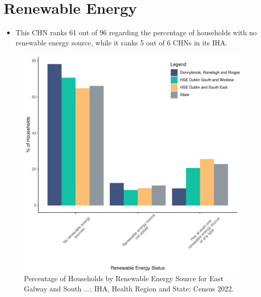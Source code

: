 \documentclass{article}
\begin{document}
\section{Renewable Energy}\label{sect:RE}
\begin{itemize}
\item This CHN ranks  61 out of 96 regarding the percentage of households with no renewable energy source, while it ranks   5 out of 6 CHNs in its IHA.
\end{itemize}
\begin{figure}[H]
	\centering
	\includegraphics[width = 140mm]{../figures/RenewableEnergyED.pdf}
	\caption{Percentage of Households by Renewable Energy Source for East Galway and South ...; IHA, Health Region and State; Census 2022.}
	\label{fig:vbnv}
	\end{figure}
\end{document}
